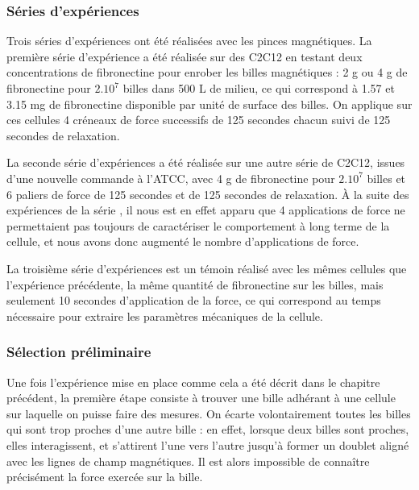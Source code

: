 \subsubsection{Séries d'expériences}

Trois séries d'expériences ont été réalisées avec les pinces magnétiques.
La première série d'expérience a été réalisée sur des C2C12 en testant deux concentrations de fibronectine pour enrober les billes magnétiques : 2 \micro g ou  4 \micro g de fibronectine pour $2.10^7$ billes dans 500 \micro L de milieu, ce qui correspond à 1.57 et 3.15 mg de fibronectine disponible par unité de surface des billes.  
On applique sur ces cellules 4 créneaux de force successifs de 125 secondes chacun suivi de 125 secondes de relaxation. 

La seconde série d'expériences a été réalisée sur une autre série de C2C12, issues d'une nouvelle commande à l'ATCC, avec 4 \micro g de fibronectine pour $2.10^7$ billes et 6 paliers de force de 125 secondes et de 125 secondes de relaxation. 
À la suite des expériences de la série , il nous est en effet apparu que 4 applications de force ne permettaient pas toujours de caractériser le comportement à long terme de la cellule, et nous avons donc augmenté le nombre d'applications de force. 

La troisième série d'expériences est un témoin réalisé avec les mêmes cellules que l'expérience précédente, la même quantité de fibronectine sur les billes, mais seulement 10 secondes d'application de la force, ce qui correspond au temps nécessaire pour extraire les paramètres mécaniques de la cellule. 




\subsubsection{Sélection préliminaire}

Une fois l'expérience mise en place comme cela a été décrit dans le chapitre précédent, la première étape consiste à trouver une bille adhérant à une cellule sur laquelle on puisse faire des mesures. 
On écarte volontairement toutes les billes qui sont trop proches d'une autre bille : en effet, lorsque deux billes sont proches, elles interagissent, et s'attirent l'une vers l'autre jusqu'à former un doublet aligné avec les lignes de champ magnétiques. Il est alors impossible de connaître précisément la force exercée sur la bille. 


